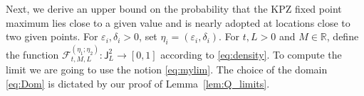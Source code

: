 \documentclass[oneside,final,11pt]{amsart}
\theoremstyle{definition}
\newcommand{\fh}{\mathfrak{h}}
\newcommand{\Dom}{\mathsf{Dom}}
\newcommand{\mylim}[1]{\underset{#1}{\wt{\mathrm{lim}}}}
\newcommand{\bJ}{\mathsf{J}}
\newcommand{\R}{\mathbb{R}}
\newcommand{\dens}{\CF}
\newcommand{\1}[1]{\mathbf{1}_{#1}}
\newcommand{\eps}{\varepsilon}
\newcommand{\wt}{\widetilde}
\renewcommand{\epsilon}{\varepsilon}
\newcommand{\CF}{\mathcal{F}}
\renewcommand{\P}{\mathbb P}
\numberwithin{equation}{section}
\begin{document}
Next, we derive an upper bound on the probability that the KPZ fixed point maximum lies close to a given value and is nearly adopted at locations close to two given points. For $\eps_i, \delta_i > 0$, set $\eta_i = (\eps_i, \delta_i)$. For $t, L > 0$ and $M \in \R$, define the function $\dens_{t, M, L}^{(\eta_1; \eta_2)} : \bJ_L^2 \to [0,1]$ according to \eqref{eq:density}. 
%
%
To compute the limit we are going to use the notion \eqref{eq:mylim}. The choice of the domain \eqref{eq:Dom} is dictated by our proof of Lemma~\ref{lem:Q_limits}. %
\end{document}
